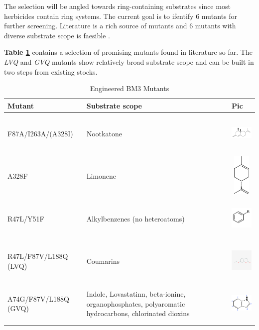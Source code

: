 \documentclass{article}
\begin{document}
The selection will be angled towards ring-containing substrates since most herbicides contain ring systems. The current goal is to ifentify 6 mutants for further screening. Literature is a rich source of mutants and 6 mutants with diverse substrate scope is faesible \textcite{wong}. %
\par
\textbf{Table \ref{bm3_table}} contains a selection of promising mutants found in literature so far. The \textit{LVQ} and \textit{GVQ} mutants show relatively broad substrate scope and can be built in two steps from existing stocks.

\begin{table}
	\begin{center}
		\caption{Engineered BM3 Mutants\label{bm3_table}}
		\begin{tabular}{l|p{3cm}|l}
		\textbf{Mutant} & \textbf{Substrate scope} & \textbf{Pic} \\
		\hline 
		F87A/I263A/(A328I) & Nootkatone & \includegraphics[width = 2cm, height= 2cm, keepaspectratio=true]{nookatone.png} \\
		A328F & Limonene & \includegraphics[width=2cm, height= 2cm, keepaspectratio=true]{limonene.png} \\
		R47L/Y51F & Alkylbenzenes (no heteroatoms) & \includegraphics[width=2cm, height= 2cm, keepaspectratio=true]{alkyl-benzene.png} \\
			R47L/F87V/L188Q (LVQ) & Coumarins & \includegraphics[width=2cm, height= 2cm, keepaspectratio=true]{7ethxycoumarin.png} \\ %
			A74G/F87V/L188Q (GVQ) & Indole, Lovastatinn, beta-ionine, organophosphates, polyaromatic hydrocarbons, chlorinated dioxins & \includegraphics[width=2cm, height= 2cm, keepaspectratio=true]{indole.png} \\
	\end{tabular}
	\end{center}
\end{table}
\end{document}
